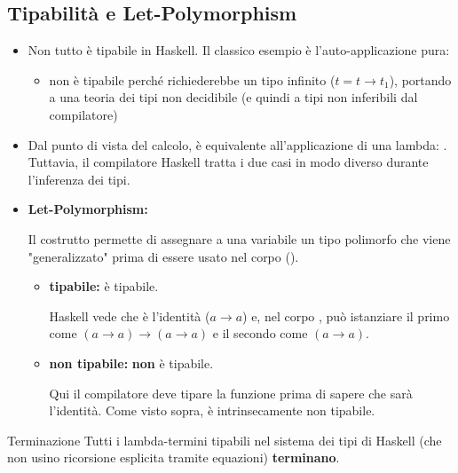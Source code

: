 \documentclass[a4paper,11pt]{report}
\begin{document}
\subsection{Tipabilità e Let-Polymorphism}
\begin{itemize}
    \item Non tutto è tipabile in Haskell. Il classico esempio è l'auto-applicazione pura:
    \begin{itemize}
        \item {} non è tipabile perché richiederebbe un tipo infinito ($t = t \to t_1$), portando a una teoria dei tipi non decidibile (e quindi a tipi non inferibili dal compilatore)
    \end{itemize}
    
    \item Dal punto di vista del calcolo,  è equivalente all'applicazione di una lambda: . Tuttavia, il compilatore Haskell tratta i due casi in modo diverso durante l'inferenza dei tipi.

    \item \textbf{Let-Polymorphism:}

    Il costrutto  permette di assegnare a una variabile un tipo polimorfo che viene "generalizzato" prima di essere usato nel corpo ().
    \begin{itemize}
        \item \textbf{tipabile:}  è tipabile.

            Haskell vede che  è l'identità ($a \to a$) e, nel corpo , può istanziare il primo  come $(a \to a) \to (a \to a)$ e il secondo come $(a \to a)$.
        \item \textbf{non tipabile:}  \textbf{non} è tipabile. 

            Qui il compilatore deve tipare la funzione  prima di sapere che  sarà l'identità. Come visto sopra,  è intrinsecamente non tipabile.
    \end{itemize}

\end{itemize}

\begin{lemmaframe}{Terminazione}{}
    Tutti i lambda-termini tipabili nel sistema dei tipi di Haskell (che non usino ricorsione esplicita tramite equazioni) \textbf{terminano}.
\end{lemmaframe}
 
\end{document}
